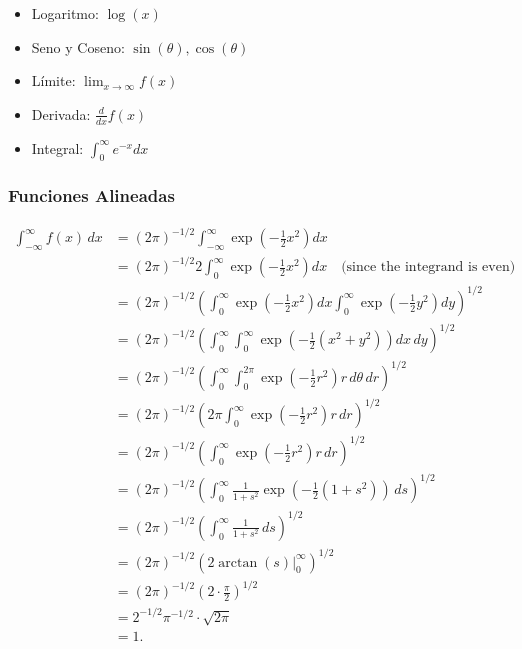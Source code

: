 \documentclass[
  10pt,
]{article}
\providecommand{\tightlist}{%
  \setlength{\itemsep}{0pt}\setlength{\parskip}{0pt}}\usepackage{longtable,booktabs,array}
\begin{document}
\begin{itemize}
\tightlist
\item
  Logaritmo: \(\log(x)\)
\item
  Seno y Coseno: \(\sin(\theta), \cos(\theta)\)
\item
  Límite: \(\lim_{x \to \infty} f(x)\)
\item
  Derivada: \(\frac{d}{dx} f(x)\)
\item
  Integral: \(\int_0^\infty e^{-x} dx\)
\end{itemize}

\subsubsection{Funciones Alineadas}\label{funciones-alineadas}

\[
\begin{aligned}
\int_{-\infty}^\infty f(x) \, dx 
&= (2\pi)^{-1/2} \int_{-\infty}^\infty \exp\left(-\frac{1}{2}x^2\right) dx \\
&= (2\pi)^{-1/2} 2 \int_{0}^\infty \exp\left(-\frac{1}{2}x^2\right) dx 
\quad \text{(since the integrand is even)} \\
&= (2\pi)^{-1/2} \left( \int_{0}^\infty \exp\left(-\frac{1}{2}x^2\right) dx 
\int_{0}^\infty \exp\left(-\frac{1}{2}y^2\right) dy \right)^{1/2} \\
&= (2\pi)^{-1/2} \left( \int_{0}^\infty \int_{0}^\infty \exp\left(-\frac{1}{2}(x^2 + y^2)\right) dx \, dy \right)^{1/2} \\
&= (2\pi)^{-1/2} \left( \int_{0}^\infty \int_{0}^{2\pi} \exp\left(-\frac{1}{2}r^2\right) r \, d\theta \, dr \right)^{1/2} \\
&= (2\pi)^{-1/2} \left( 2\pi \int_{0}^\infty \exp\left(-\frac{1}{2}r^2\right) r \, dr \right)^{1/2} \\
&= (2\pi)^{-1/2} \left( \int_{0}^\infty \exp\left(-\frac{1}{2}r^2\right) r \, dr \right)^{1/2} \\
&= (2\pi)^{-1/2} \left( \int_{0}^\infty \frac{1}{1+s^2} \exp\left(-\frac{1}{2}(1+s^2)\right) \, ds \right)^{1/2} \\
&= (2\pi)^{-1/2} \left( \int_{0}^\infty \frac{1}{1+s^2} \, ds \right)^{1/2} \\
&= (2\pi)^{-1/2} \left( 2 \arctan(s) \Big|_0^\infty \right)^{1/2} \\
&= (2\pi)^{-1/2} \left( 2 \cdot \frac{\pi}{2} \right)^{1/2} \\
&= 2^{-1/2} \pi^{-1/2} \cdot \sqrt{2\pi} \\
&= 1.
\end{aligned}
\]
\end{document}
